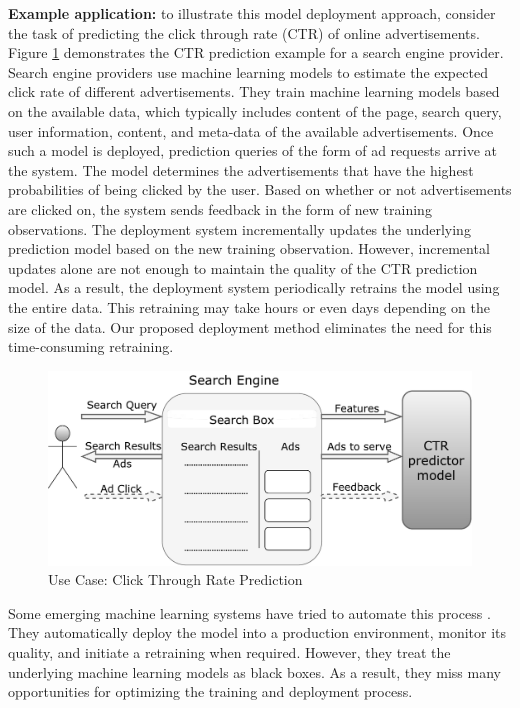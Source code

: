 \documentclass{vldb}
\begin{document}
\textbf{Example application:} to illustrate this model deployment approach, consider the task of predicting the click through rate (CTR) of online advertisements.
Figure \ref{fig:click-rate} demonstrates the CTR prediction example for a search engine provider.
Search engine providers use machine learning models to estimate the expected click rate of different advertisements.
They train machine learning models based on the available data, which typically includes content of the page, search query, user information, content, and meta-data of the available advertisements. 
Once such a model is deployed, prediction queries of the form of ad requests arrive at the system.
The model determines the advertisements that have the highest probabilities of being clicked by the user.
Based on whether or not advertisements are clicked on, the system sends feedback in the form of new training observations.
The deployment system incrementally updates the underlying prediction model based on the new training observation. 
However, incremental updates alone are not enough to maintain the quality of the CTR prediction model.
As a result, the deployment system periodically retrains the model using the entire data.
This retraining may take hours or even days depending on the size of the data.
Our proposed deployment method eliminates the need for this time-consuming retraining.

\begin{figure}[h]
\centering
\includegraphics[width=\columnwidth]{../images/use-case-final.pdf}
\caption{Use Case: Click Through Rate Prediction}
\label{fig:click-rate}
\end{figure}

Some emerging machine learning systems have tried to automate this process \cite{crankshaw2014missing}.
They automatically deploy the model into a production environment, monitor its quality, and initiate a retraining when required.
However, they treat the underlying machine learning models as black boxes. 
As a result, they miss many opportunities for optimizing the training and deployment process.
\end{document}

